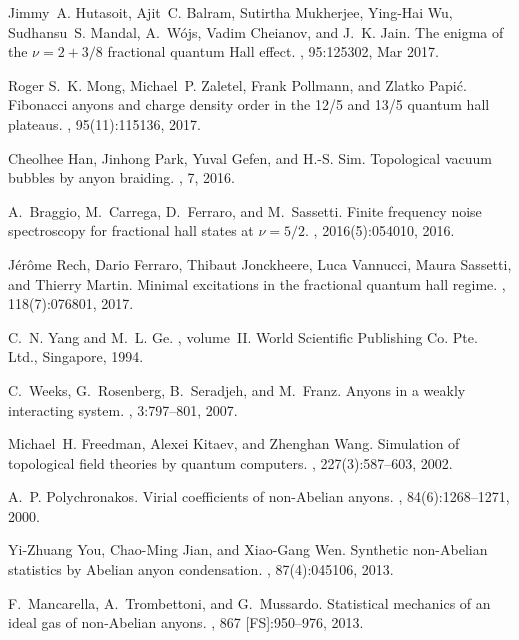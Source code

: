 \documentclass[12pt,a4paper]{article}
\begin{document}
{\begin{thebibliography}{10}
Jimmy~A. Hutasoit, Ajit~C. Balram, Sutirtha Mukherjee, Ying-Hai Wu, Sudhansu~S.
  Mandal, A.~W\'ojs, Vadim Cheianov, and J.~K. Jain.
\newblock The enigma of the {$\nu=2+3/8$} fractional quantum {H}all effect.
, 95:125302, Mar 2017.

Roger S.~K. Mong, Michael~P. Zaletel, Frank Pollmann, and Zlatko Papi{\'c}.
\newblock Fibonacci anyons and charge density order in the 12/5 and 13/5
  quantum hall plateaus.
, 95(11):115136, 2017.

Cheolhee Han, Jinhong Park, Yuval Gefen, and H.-S. Sim.
\newblock Topological vacuum bubbles by anyon braiding.
, 7, 2016.

A.~Braggio, M.~Carrega, D.~Ferraro, and M.~Sassetti.
\newblock Finite frequency noise spectroscopy for fractional hall states at
  $\nu= 5/2$.
, 2016(5):054010, 2016.

J{\'e}r{\^o}me Rech, Dario Ferraro, Thibaut Jonckheere, Luca Vannucci, Maura
  Sassetti, and Thierry Martin.
\newblock Minimal excitations in the fractional quantum hall regime.
, 118(7):076801, 2017.

C.~N. Yang and M.~L. Ge.
,
  volume~II.
\newblock World Scientific Publishing Co. Pte. Ltd., Singapore, 1994.

C.~Weeks, G.~Rosenberg, B.~Seradjeh, and M.~Franz.
\newblock Anyons in a weakly interacting system.
, 3:797--801, 2007.

Michael~H. Freedman, Alexei Kitaev, and Zhenghan Wang.
\newblock Simulation of topological field theories by quantum computers.
, 227(3):587--603, 2002.

A.~P. Polychronakos.
\newblock Virial coefficients of non-{A}belian anyons.
, 84(6):1268--1271, 2000.

Yi-Zhuang You, Chao-Ming Jian, and Xiao-Gang Wen.
\newblock Synthetic non-{A}belian statistics by {A}belian anyon condensation.
, 87(4):045106, 2013.

F.~Mancarella, A.~Trombettoni, and G.~Mussardo.
\newblock Statistical mechanics of an ideal gas of non-{A}belian anyons.
, 867 [FS]:950--976, 2013.


\end{thebibliography}}
\end{document}

